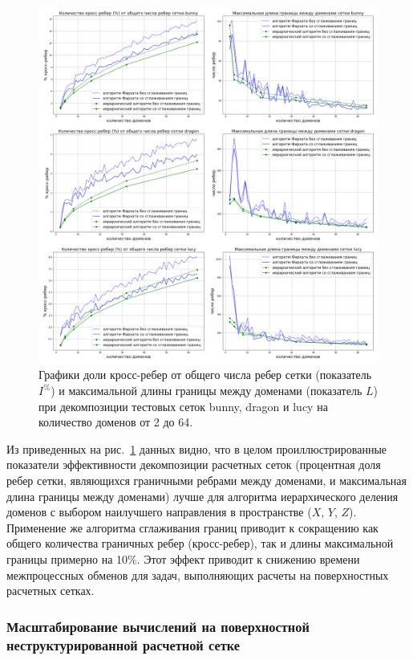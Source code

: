 \begin{figure}[H]
\centering
\includegraphics[width=1.0\textwidth]{fig/par_smooth_graphics.pdf}
\singlespacing
{}\caption{Графики доли кросс-ребер от общего числа ребер сетки (показатель $I^{\%}$) и максимальной длины границы между доменами (показатель $L$) при декомпозиции тестовых сеток bunny, dragon и lucy на количество доменов от 2 до 64.}
\label{fig:text_2_smooth_graphics}
\end{figure}

Из приведенных на рис.~\ref{fig:text_2_smooth_graphics} данных видно, что в целом проиллюстрированные показатели эффективности декомпозиции расчетных сеток (процентная доля ребер сетки, являющихся граничными ребрами между доменами, и максимальная длина границы между доменами) лучше для алгоритма иерархического деления доменов с выбором наилучшего направления в пространстве ($X$, $Y$, $Z$).
Применение же алгоритма сглаживания границ приводит к сокращению как общего количества граничных ребер (кросс-ребер), так и длины максимальной границы примерно на 10\%.
Этот эффект приводит к снижению времени межпроцессных обменов для задач, выполняющих расчеты на поверхностных расчетных сетках.

\subsubsection{Масштабирование вычислений на поверхностной \\ неструктурированной расчетной сетке}

